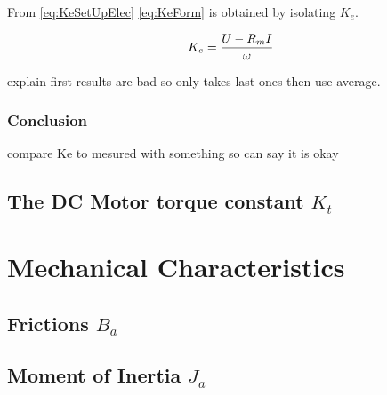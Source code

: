 From \autoref{eq:KeSetUpElec} \autoref{eq:KeForm} is obtained by isolating $K_e$.

\begin{equation}
K_e=\frac{U-R_m I}{\omega} \addunit{\volt\per\radian\second}
\label{eq:KeForm}
\end{equation}

explain first results are bad so only takes last ones then use average.

\subsubsection*{Conclusion}

compare Ke to mesured with something so can say it is okay

\subsection{The DC Motor torque constant $K_t$}


\section{Mechanical Characteristics}
\subsection{Frictions $B_a$}

\subsection{Moment of Inertia $J_a$}
